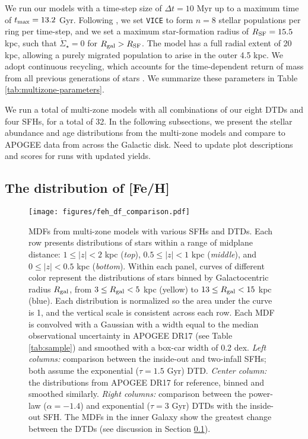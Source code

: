 \documentclass[twocolumn,twocolappendix,linenumbers]{aastex631}
\newcommand{\vice}{{\tt VICE}\xspace}
\newcommand{\todo}[1]{{\color{red}#1}}
\begin{document}
We run our models with a time-step size of $\Delta t=10$ Myr up to a maximum time of $t_{\rm max}=13.2$ Gyr. Following , we set \vice to form $n=8$ stellar populations per ring per time-step, and we set a maximum star-formation radius of $R_{\rm SF} = 15.5$ kpc, such that $\dot\Sigma_\star=0$ for $R_{\rm gal}>R_{\rm SF}$. The model has a full radial extent of 20 kpc, allowing a purely migrated population to arise in the outer 4.5 kpc. We adopt continuous recycling, which accounts for the time-dependent return of mass from all previous generations of stars \citep[see Equation 2 from][]{JohnsonWeinberg2020-Starbursts}. We summarize these parameters in Table \ref{tab:multizone-parameters}.

We run a total of multi-zone models with all combinations of our eight DTDs and four SFHs, for a total of 32. In the following subsections, we present the stellar abundance and age distributions from the multi-zone models and compare to APOGEE data from across the Galactic disk. \todo{Need to update plot descriptions and scores for runs with updated yields.}

\subsection{The distribution of [Fe/H]}
\label{sec:feh-df}

\begin{figure*}
    \centering
    \texttt{[image: figures/feh\_df\_comparison.pdf]}
    \caption{MDFs from multi-zone models with various SFHs and DTDs. Each row presents distributions of stars within a range of midplane distance: $1\leq|z|<2$ kpc (\textit{top}), $0.5\leq|z|<1$ kpc (\textit{middle}), and $0\leq|z|<0.5$ kpc (\textit{bottom}). Within each panel, curves of different color represent the distributions of stars binned by Galactocentric radius $R_{\rm gal}$, from $3\leq R_{\rm gal}<5$ kpc (yellow) to $13\leq R_{\rm gal}<15$ kpc (blue). Each distribution is normalized so the area under the curve is 1, and the vertical scale is consistent across each row. Each MDF is convolved with a Gaussian with a width equal to the median observational uncertainty in APOGEE DR17 (see Table \ref{tab:sample}) and smoothed with a box-car width of 0.2 dex. 
    \textit{Left columns:} comparison between the inside-out and two-infall SFHs; both assume the exponential ($\tau=1.5$ Gyr) DTD. 
    \textit{Center column:} the distributions from APOGEE DR17 for reference, binned and smoothed similarly.
    \textit{Right columns:} comparison between the power-law ($\alpha=-1.4$) and exponential ($\tau=3$ Gyr) DTDs with the inside-out SFH. The MDFs in the inner Galaxy show the greatest change between the DTDs (see discussion in Section \ref{sec:feh-df}).}
    \label{fig:feh-df-comparison}
\end{figure*}
\end{document}
